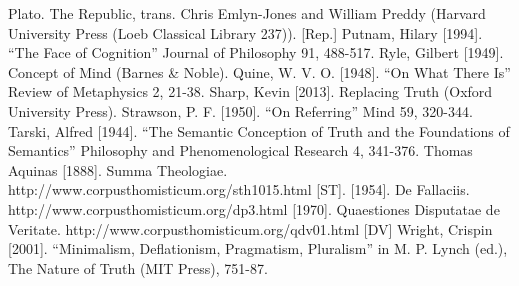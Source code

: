 \documentclass[]{article}
\begin{document}
Plato. The Republic, trans. Chris Emlyn-Jones and William Preddy (Harvard University Press (Loeb Classical Library 237)). [Rep.]
Putnam, Hilary [1994]. “The Face of Cognition” Journal of Philosophy 91, 488-517.
Ryle, Gilbert [1949]. Concept of Mind (Barnes & Noble).
Quine, W. V. O. [1948]. “On What There Is” Review of Metaphysics 2, 21-38.
Sharp, Kevin [2013]. Replacing Truth (Oxford University Press).
Strawson, P. F. [1950]. “On Referring” Mind 59, 320-344.
Tarski, Alfred [1944]. “The Semantic Conception of Truth and the Foundations of Semantics” Philosophy and Phenomenological Research 4, 341-376.
Thomas Aquinas [1888]. Summa Theologiae. http://www.corpusthomisticum.org/sth1015.html [ST].
[1954]. De Fallaciis. http://www.corpusthomisticum.org/dp3.html 
[1970]. Quaestiones Disputatae de Veritate. http://www.corpusthomisticum.org/qdv01.html [DV]
Wright, Crispin [2001]. “Minimalism, Deflationism, Pragmatism, Pluralism” in M. P. Lynch (ed.), The Nature of Truth (MIT Press), 751-87.
\end{document}

